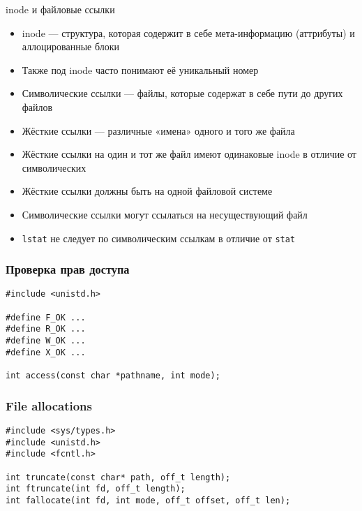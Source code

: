 \documentclass[10pt,pdf,hyperref={unicode}]{beamer}
\begin{document}
\begin{frame}{inode и файловые ссылки}
\begin{itemize}
    \item inode — структура, которая содержит в себе мета-информацию (аттрибуты) и аллоцированные блоки
    \item Также под inode часто понимают её уникальный номер
    \item Символические ссылки — файлы, которые содержат в себе пути до других файлов
    \item Жёсткие ссылки — различные «имена» одного и того же файла
    \item Жёсткие ссылки на один и тот же файл имеют одинаковые inode в отличие от символических
    \item Жёсткие ссылки должны быть на одной файловой системе
    \item Символические ссылки могут ссылаться на несуществующий файл
    \item \texttt{lstat} не следует по символическим ссылкам в отличие от \texttt{stat}
\end{itemize}
\end{frame}

\begin{frame}[fragile]
\frametitle{Проверка прав доступа}
\begin{center}
    \begin{minipage}{0.95\textwidth}
        \begin{verbatim}
#include <unistd.h>

#define F_OK ...
#define R_OK ...
#define W_OK ...
#define X_OK ...

int access(const char *pathname, int mode);
        \end{verbatim}
    \end{minipage}
\end{center}
\end{frame}


\begin{frame}[fragile]
\frametitle{File allocations}
\begin{center}
    \begin{minipage}{0.95\textwidth}
        \begin{verbatim}
#include <sys/types.h>
#include <unistd.h>
#include <fcntl.h>

int truncate(const char* path, off_t length);
int ftruncate(int fd, off_t length);
int fallocate(int fd, int mode, off_t offset, off_t len);
        \end{verbatim}
    \end{minipage}
\end{center}
\end{frame}
\end{document}
